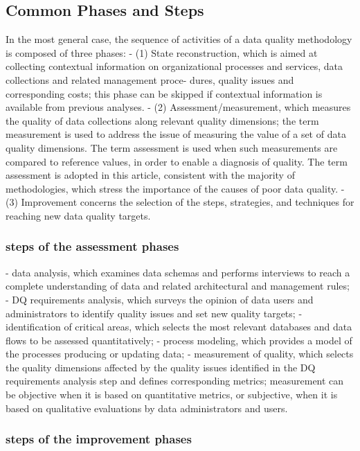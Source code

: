\documentclass[pdftex,english,oribibl]{llncs}
\begin{document}
    \subsection{Common Phases and Steps}
    In the most general case, the sequence of activities of a data quality methodology is composed of three phases:
    - (1) State reconstruction, which is aimed at collecting contextual information on organizational processes and services, data collections and related management proce- dures, quality issues and corresponding costs; this phase can be skipped if contextual information is available from previous analyses.
    - (2) Assessment/measurement, which measures the quality of data collections along relevant quality dimensions; the term measurement is used to address the issue of measuring the value of a set of data quality dimensions. The term assessment is used when such measurements are compared to reference values, in order to enable a diagnosis of quality. The term assessment is adopted in this article, consistent with the majority of methodologies, which stress the importance of the causes of poor data quality.
    - (3) Improvement concerns the selection of the steps, strategies, and techniques for reaching new data quality targets.

    \subsubsection{steps of the assessment phases}

    - data analysis, which examines data schemas and performs interviews to reach a complete understanding of data and related architectural and management rules;
    - DQ requirements analysis, which surveys the opinion of data users and administrators to identify quality issues and set new quality targets;
    - identification of critical areas, which selects the most relevant databases and data flows to be assessed quantitatively;
    - process modeling, which provides a model of the processes producing or updating data;
    - measurement of quality, which selects the quality dimensions affected by the quality issues identified in the DQ requirements analysis step and defines corresponding metrics; measurement can be objective when it is based on quantitative metrics, or subjective, when it is based on qualitative evaluations by data administrators and users.

    \subsubsection{steps of the improvement phases}
\end{document}
